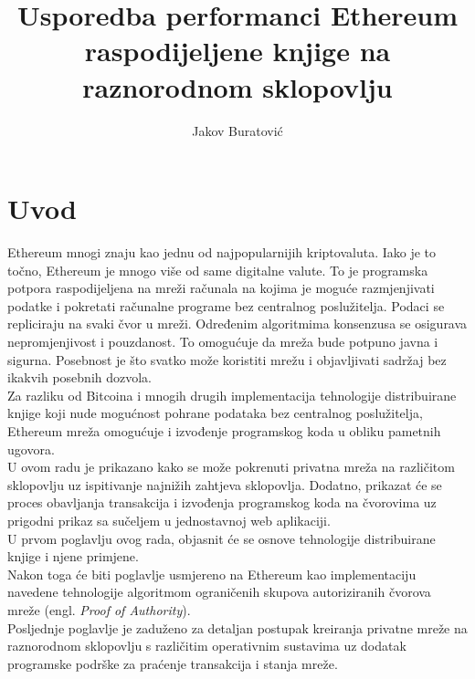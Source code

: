 \documentclass[times, utf8, zavrsni]{fer}
\begin{document}

\title{Usporedba performanci Ethereum raspodijeljene knjige na raznorodnom sklopovlju}

\author{Jakov Buratović}

\maketitle

\izvornik


\tableofcontents

\chapter{Uvod}
Ethereum mnogi znaju kao jednu od najpopularnijih kriptovaluta. Iako je to točno, Ethereum je mnogo
više od same digitalne valute. To je programska potpora raspodijeljena na mreži računala na kojima je
moguće razmjenjivati podatke i pokretati računalne programe bez centralnog poslužitelja. 
Podaci se repliciraju na svaki čvor u mreži. Određenim algoritmima konsenzusa se osigurava 
nepromjenjivost i pouzdanost. 
To omogućuje da mreža bude potpuno javna i sigurna. Posebnost je što svatko može koristiti
mrežu i objavljivati sadržaj bez ikakvih posebnih dozvola. \\ Za razliku od Bitcoina
i mnogih drugih implementacija tehnologije distribuirane knjige koji nude mogućnost pohrane podataka
bez centralnog poslužitelja, Ethereum mreža omogućuje i izvođenje programskog koda u obliku pametnih ugovora.\\
U ovom radu je prikazano kako se može pokrenuti privatna mreža na različitom sklopovlju uz  ispitivanje najnižih zahtjeva sklopovlja.
Dodatno, prikazat će se proces obavljanja transakcija i izvođenja programskog koda na čvorovima uz prigodni prikaz sa sučeljem u jednostavnoj web aplikaciji.\\
U prvom poglavlju ovog rada, objasnit će se osnove tehnologije distribuirane knjige i njene primjene.\\
Nakon toga će biti poglavlje usmjereno na Ethereum kao implementaciju navedene tehnologije algoritmom ograničenih skupova autoriziranih čvorova mreže (engl. \emph{Proof of Authority}). \\
Posljednje poglavlje je zaduženo za detaljan postupak kreiranja privatne mreže na raznorodnom sklopovlju
s različitim operativnim sustavima uz dodatak programske podrške za praćenje transakcija i stanja mreže.  
\end{document}
